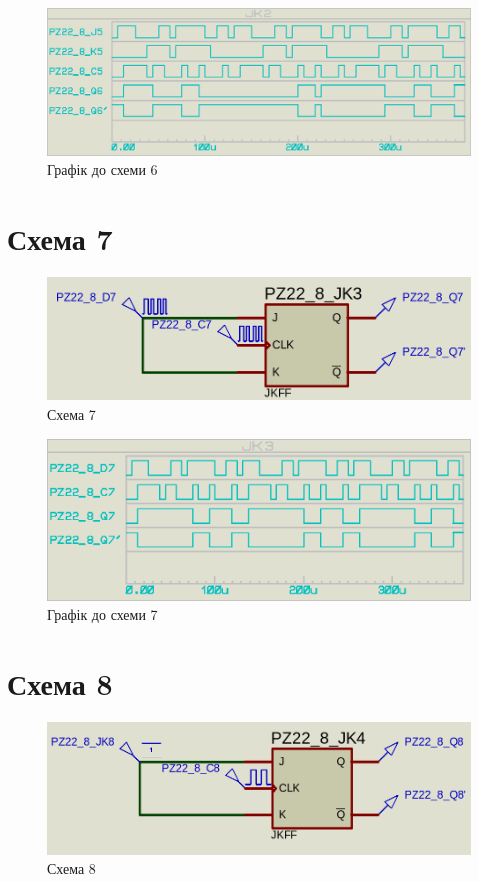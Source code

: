 \documentclass{article}
\begin{document}
\begin{normalsize}
	\begin{figure}[H]
		\centering
		\includegraphics[scale=0.25]{g6}	
		\caption{Графік до схеми 6}
	\end{figure}

	\section*{Схема 7}	
	\begin{figure}[H]
		\centering
		\includegraphics[scale=0.25]{s7}	
		\caption{Схема 7}
	\end{figure}
	
	\begin{figure}[H]
		\centering
		\includegraphics[scale=0.25]{g7}	
		\caption{Графік до схеми 7}
	\end{figure}

	\section*{Схема 8}	
	\begin{figure}[H]
		\centering
		\includegraphics[scale=0.25]{s8}	
		\caption{Схема 8}
	\end{figure}
	

\end{normalsize}
\end{document}
